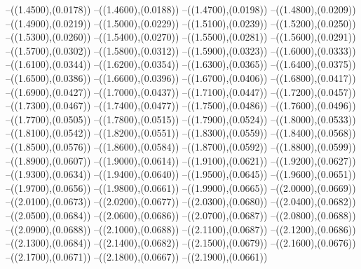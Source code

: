 {	--({\sx*(1.4500)},{\sy*(0.0178)})
	--({\sx*(1.4600)},{\sy*(0.0188)})
	--({\sx*(1.4700)},{\sy*(0.0198)})
	--({\sx*(1.4800)},{\sy*(0.0209)})
	--({\sx*(1.4900)},{\sy*(0.0219)})
	--({\sx*(1.5000)},{\sy*(0.0229)})
	--({\sx*(1.5100)},{\sy*(0.0239)})
	--({\sx*(1.5200)},{\sy*(0.0250)})
	--({\sx*(1.5300)},{\sy*(0.0260)})
	--({\sx*(1.5400)},{\sy*(0.0270)})
	--({\sx*(1.5500)},{\sy*(0.0281)})
	--({\sx*(1.5600)},{\sy*(0.0291)})
	--({\sx*(1.5700)},{\sy*(0.0302)})
	--({\sx*(1.5800)},{\sy*(0.0312)})
	--({\sx*(1.5900)},{\sy*(0.0323)})
	--({\sx*(1.6000)},{\sy*(0.0333)})
	--({\sx*(1.6100)},{\sy*(0.0344)})
	--({\sx*(1.6200)},{\sy*(0.0354)})
	--({\sx*(1.6300)},{\sy*(0.0365)})
	--({\sx*(1.6400)},{\sy*(0.0375)})
	--({\sx*(1.6500)},{\sy*(0.0386)})
	--({\sx*(1.6600)},{\sy*(0.0396)})
	--({\sx*(1.6700)},{\sy*(0.0406)})
	--({\sx*(1.6800)},{\sy*(0.0417)})
	--({\sx*(1.6900)},{\sy*(0.0427)})
	--({\sx*(1.7000)},{\sy*(0.0437)})
	--({\sx*(1.7100)},{\sy*(0.0447)})
	--({\sx*(1.7200)},{\sy*(0.0457)})
	--({\sx*(1.7300)},{\sy*(0.0467)})
	--({\sx*(1.7400)},{\sy*(0.0477)})
	--({\sx*(1.7500)},{\sy*(0.0486)})
	--({\sx*(1.7600)},{\sy*(0.0496)})
	--({\sx*(1.7700)},{\sy*(0.0505)})
	--({\sx*(1.7800)},{\sy*(0.0515)})
	--({\sx*(1.7900)},{\sy*(0.0524)})
	--({\sx*(1.8000)},{\sy*(0.0533)})
	--({\sx*(1.8100)},{\sy*(0.0542)})
	--({\sx*(1.8200)},{\sy*(0.0551)})
	--({\sx*(1.8300)},{\sy*(0.0559)})
	--({\sx*(1.8400)},{\sy*(0.0568)})
	--({\sx*(1.8500)},{\sy*(0.0576)})
	--({\sx*(1.8600)},{\sy*(0.0584)})
	--({\sx*(1.8700)},{\sy*(0.0592)})
	--({\sx*(1.8800)},{\sy*(0.0599)})
	--({\sx*(1.8900)},{\sy*(0.0607)})
	--({\sx*(1.9000)},{\sy*(0.0614)})
	--({\sx*(1.9100)},{\sy*(0.0621)})
	--({\sx*(1.9200)},{\sy*(0.0627)})
	--({\sx*(1.9300)},{\sy*(0.0634)})
	--({\sx*(1.9400)},{\sy*(0.0640)})
	--({\sx*(1.9500)},{\sy*(0.0645)})
	--({\sx*(1.9600)},{\sy*(0.0651)})
	--({\sx*(1.9700)},{\sy*(0.0656)})
	--({\sx*(1.9800)},{\sy*(0.0661)})
	--({\sx*(1.9900)},{\sy*(0.0665)})
	--({\sx*(2.0000)},{\sy*(0.0669)})
	--({\sx*(2.0100)},{\sy*(0.0673)})
	--({\sx*(2.0200)},{\sy*(0.0677)})
	--({\sx*(2.0300)},{\sy*(0.0680)})
	--({\sx*(2.0400)},{\sy*(0.0682)})
	--({\sx*(2.0500)},{\sy*(0.0684)})
	--({\sx*(2.0600)},{\sy*(0.0686)})
	--({\sx*(2.0700)},{\sy*(0.0687)})
	--({\sx*(2.0800)},{\sy*(0.0688)})
	--({\sx*(2.0900)},{\sy*(0.0688)})
	--({\sx*(2.1000)},{\sy*(0.0688)})
	--({\sx*(2.1100)},{\sy*(0.0687)})
	--({\sx*(2.1200)},{\sy*(0.0686)})
	--({\sx*(2.1300)},{\sy*(0.0684)})
	--({\sx*(2.1400)},{\sy*(0.0682)})
	--({\sx*(2.1500)},{\sy*(0.0679)})
	--({\sx*(2.1600)},{\sy*(0.0676)})
	--({\sx*(2.1700)},{\sy*(0.0671)})
	--({\sx*(2.1800)},{\sy*(0.0667)})
	--({\sx*(2.1900)},{\sy*(0.0661)})
}
